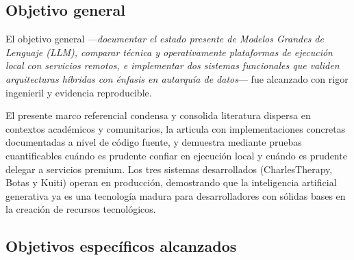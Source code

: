 \documentclass[12pt,a4paper]{report}
\numberwithin{figure}{section}
\begin{document}
\subsection{Objetivo general}

El objetivo general —\textit{documentar el estado presente de Modelos Grandes de Lenguaje (LLM), comparar técnica y operativamente plataformas de ejecución local con servicios remotos, e implementar dos sistemas funcionales que validen arquitecturas híbridas con énfasis en autarquía de datos}— fue alcanzado con rigor ingenieril y evidencia reproducible.

El presente marco referencial condensa y consolida literatura dispersa en contextos académicos y comunitarios, la articula con implementaciones concretas documentadas a nivel de código fuente, y demuestra mediante pruebas cuantificables cuándo es prudente confiar en ejecución local y cuándo es prudente delegar a servicios premium. Los tres sistemas desarrollados (CharlesTherapy, Botas y Kuiti) operan en producción, demostrando que la inteligencia artificial generativa ya es una tecnología madura para desarrolladores con sólidas bases en la creación de recursos tecnológicos.

\subsection{Objetivos específicos alcanzados}
\end{document}
